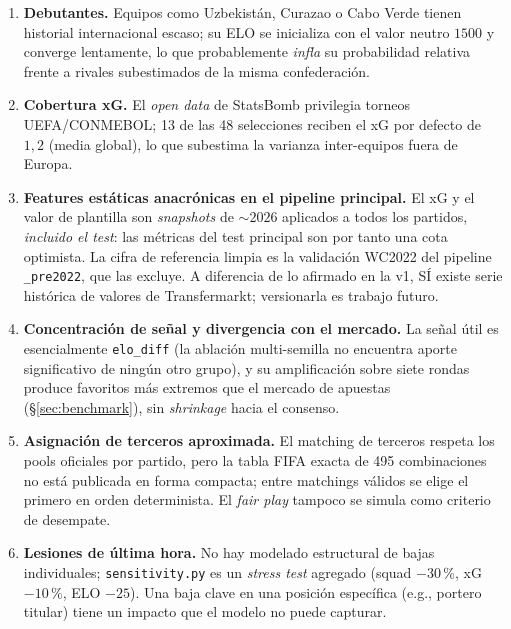 \documentclass[conference]{IEEEtran}
\begin{document}
\begin{enumerate}
  \item \textbf{Debutantes.} Equipos como Uzbekist\'an, Curazao o Cabo
        Verde tienen historial internacional escaso; su ELO se inicializa con
        el valor neutro $1500$ y converge lentamente, lo que probablemente
        \emph{infla} su probabilidad relativa frente a rivales subestimados de
        la misma confederaci\'on.
  \item \textbf{Cobertura xG.} El \emph{open data} de StatsBomb
        \cite{statsbomb} privilegia torneos UEFA/CONMEBOL; 13 de las 48
        selecciones reciben el xG por defecto de $1{,}2$ (media global), lo
        que subestima la varianza inter-equipos fuera de Europa.
  \item \textbf{Features est\'aticas anacr\'onicas en el pipeline
        principal.} El xG y el valor de plantilla son \emph{snapshots} de
        ${\sim}2026$ aplicados a todos los partidos, \emph{incluido el
        test}: las m\'etricas del test principal son por tanto una cota
        optimista. La cifra de referencia limpia es la validaci\'on WC2022
        del pipeline \texttt{\_pre2022}, que las excluye. A diferencia de
        lo afirmado en la v1, S\'I existe serie hist\'orica de valores de
        Transfermarkt; versionarla es trabajo futuro.
  \item \textbf{Concentraci\'on de se\~nal y divergencia con el
        mercado.} La se\~nal \'util es esencialmente \texttt{elo\_diff}
        (la ablaci\'on multi-semilla no encuentra aporte significativo de
        ning\'un otro grupo), y su amplificaci\'on sobre siete rondas
        produce favoritos m\'as extremos que el mercado de apuestas
        (\S\ref{sec:benchmark}), sin \emph{shrinkage} hacia el consenso.
  \item \textbf{Asignaci\'on de terceros aproximada.} El matching de
        terceros respeta los pools oficiales por partido, pero la tabla
        FIFA exacta de 495 combinaciones no est\'a publicada en forma
        compacta; entre matchings v\'alidos se elige el primero en orden
        determinista. El \emph{fair play} tampoco se simula como criterio
        de desempate.
  \item \textbf{Lesiones de \'ultima hora.} No hay modelado estructural
        de bajas individuales; \texttt{sensitivity.py} es un \emph{stress
        test} agregado (squad $-30$\,\%, xG $-10$\,\%, ELO $-25$). Una baja
        clave en una posici\'on espec\'ifica (e.g., portero titular) tiene
        un impacto que el modelo no puede capturar.
\end{enumerate}
\end{document}
